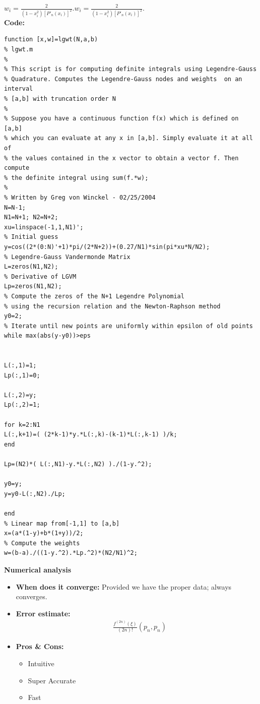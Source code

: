\documentclass{article}
\begin{document}
$ {\displaystyle w_{i}={\frac {2}{\left(1-x_{i}^{2}\right)[P'_{n}(x_{i})]^{2}}}.} w_{i}={\frac {2}{\left(1-x_{i}^{2}\right)[P'_{n}(x_{i})]^{2}}}. $
{\\\bf Code:}
\begin{verbatim}
function [x,w]=lgwt(N,a,b)
% lgwt.m
%
% This script is for computing definite integrals using Legendre-Gauss 
% Quadrature. Computes the Legendre-Gauss nodes and weights  on an interval
% [a,b] with truncation order N
%
% Suppose you have a continuous function f(x) which is defined on [a,b]
% which you can evaluate at any x in [a,b]. Simply evaluate it at all of
% the values contained in the x vector to obtain a vector f. Then compute
% the definite integral using sum(f.*w);
%
% Written by Greg von Winckel - 02/25/2004
N=N-1;
N1=N+1; N2=N+2;
xu=linspace(-1,1,N1)';
% Initial guess
y=cos((2*(0:N)'+1)*pi/(2*N+2))+(0.27/N1)*sin(pi*xu*N/N2);
% Legendre-Gauss Vandermonde Matrix
L=zeros(N1,N2);
% Derivative of LGVM
Lp=zeros(N1,N2);
% Compute the zeros of the N+1 Legendre Polynomial
% using the recursion relation and the Newton-Raphson method
y0=2;
% Iterate until new points are uniformly within epsilon of old points
while max(abs(y-y0))>eps


L(:,1)=1;
Lp(:,1)=0;

L(:,2)=y;
Lp(:,2)=1;

for k=2:N1
L(:,k+1)=( (2*k-1)*y.*L(:,k)-(k-1)*L(:,k-1) )/k;
end

Lp=(N2)*( L(:,N1)-y.*L(:,N2) )./(1-y.^2);   

y0=y;
y=y0-L(:,N2)./Lp;

end
% Linear map from[-1,1] to [a,b]
x=(a*(1-y)+b*(1+y))/2;      
% Compute the weights
w=(b-a)./((1-y.^2).*Lp.^2)*(N2/N1)^2;
\end{verbatim}
{\bf Numerical analysis}
\begin{itemize}
	\item{\bf When does it converge:} Provided we have the proper data; always converges.
	\item {\bf Error estimate:}
	\begin{equation}
	\begin{split}
	&\frac { f ^ { ( 2 n ) } ( \xi ) } { ( 2 n ) ! } \left( p _ { n } , p _ { n } \right)
	\end{split}
	\end{equation}
	\item {\bf Pros \& Cons:}
	\begin{itemize}
		\item Intuitive
		\item Super Accurate
		\item Fast
	\end{itemize}
\end{itemize}
\end{document}
